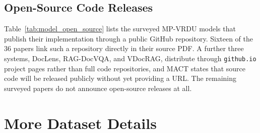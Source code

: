 \documentclass[11pt]{article}
\begin{document}
\subsection{Open-Source Code Releases}
\label{app:open-source}
Table~\ref{tab:model_open_source} lists the surveyed MP-VRDU models that publish their implementation through a public GitHub repository. Sixteen of the 36 papers link such a repository directly in their source PDF. A further three systems, DocLens, RAG-DocVQA, and VDocRAG, distribute through \texttt{github.io} project pages rather than full code repositories, and MACT states that source code will be released publicly without yet providing a URL. The remaining surveyed papers do not announce open-source releases at all.

\section{More Dataset Details}
\label{app:datasets}


\end{document}
